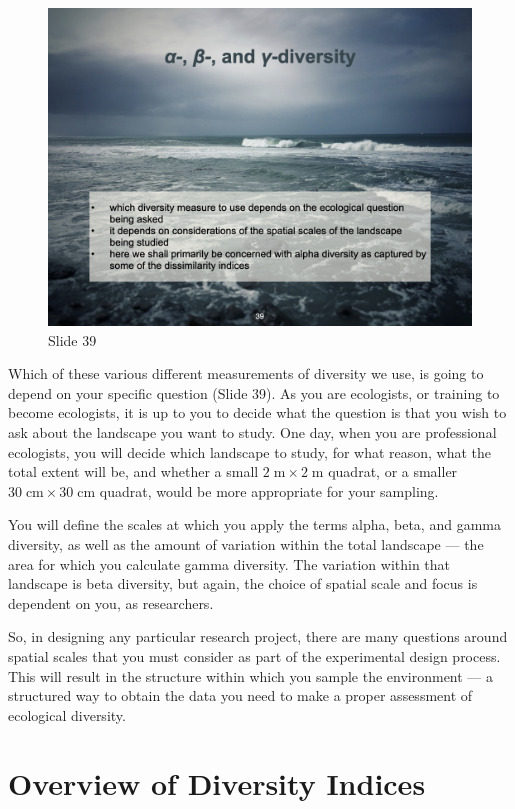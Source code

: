 \documentclass[
  11pt,
]{book}
\begin{document}
\begin{figure}[ht]
\centering
\includegraphics[width=0.8\linewidth]{../images/BDC334/BDC334-039.jpeg}
\caption*{Slide 39}
\end{figure}

Which of these various different measurements of diversity we use, is
going to depend on your specific question (Slide 39). As you are
ecologists, or training to become ecologists, it is up to you to decide
what the question is that you wish to ask about the landscape you want
to study. One day, when you are professional ecologists, you will decide
which landscape to study, for what reason, what the total extent will
be, and whether a small \(2\;\mathrm{m} \times 2\;\mathrm{m}\) quadrat,
or a smaller \(30\;\mathrm{cm} \times 30\;\mathrm{cm}\) quadrat, would
be more appropriate for your sampling.

You will define the scales at which you apply the terms alpha, beta, and
gamma diversity, as well as the amount of variation within the total
landscape --- the area for which you calculate gamma diversity. The
variation within that landscape is beta diversity, but again, the choice
of spatial scale and focus is dependent on you, as researchers.

So, in designing any particular research project, there are many
questions around spatial scales that you must consider as part of the
experimental design process. This will result in the structure within
which you sample the environment --- a structured way to obtain the data
you need to make a proper assessment of ecological diversity.

\section{Overview of Diversity
Indices}\label{overview-of-diversity-indices}
\end{document}
